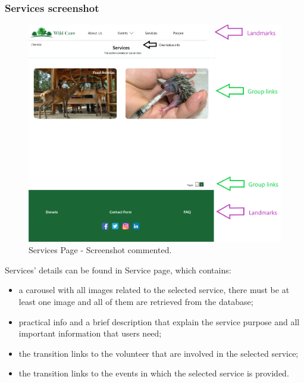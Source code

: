 \subsubsection{Services screenshot}
\begin{figure}[h!]
	\centering
	\begin{minipage}[b]{1\textwidth}
    		\includegraphics[width=\textwidth]{./assets/mockups/services_commented.png}
		\caption{Services Page - Screenshot commented.}
	\end{minipage}
\end{figure}
\FloatBarrier

\vspace{1cm}
\hspace{-1cm}
Services' details can be found in Service page, which contains:
\begin{itemize}
	\item a carousel with all images related to the selected service, there must be at least one image and all of them are retrieved 			from the database;
	\item practical info and a brief description that explain the service purpose and all important information that users need;
	\item the transition links to the volunteer that are involved in the selected service;
	\item the transition links to the events in which the selected service is provided.
\end{itemize} 

